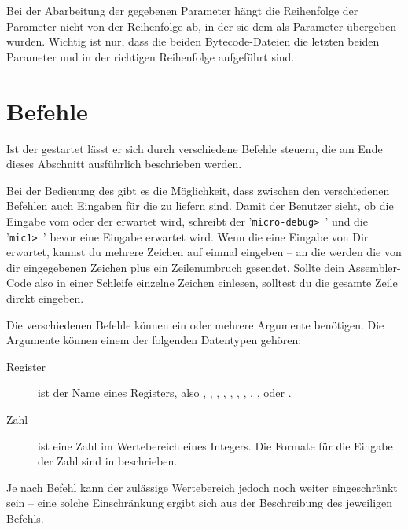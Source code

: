 Bei der Abarbeitung der gegebenen Parameter hängt die Reihenfolge der Parameter nicht von der Reihenfolge ab, in der sie dem \md als Parameter übergeben wurden. Wichtig ist nur, dass die beiden Bytecode-Dateien die letzten beiden Parameter und in der richtigen Reihenfolge aufgeführt sind.

\section{Befehle}
Ist der \md gestartet lässt er sich durch verschiedene Befehle steuern, die am Ende dieses Abschnitt ausführlich beschrieben werden.

Bei der Bedienung des \md gibt es die Möglichkeit, dass zwischen den verschiedenen Befehlen auch Eingaben für die \mic zu liefern sind. Damit der Benutzer sieht, ob die Eingabe vom \md oder der \mic erwartet wird, schreibt der \md '\texttt{micro-debug> }' und die \mic '\texttt{mic1> }' bevor eine Eingabe erwartet wird. Wenn die \mic eine Eingabe von Dir erwartet, kannst du mehrere Zeichen auf einmal eingeben -- an die \mic werden die von dir eingegebenen Zeichen plus ein Zeilenumbruch gesendet. Sollte dein Assembler-Code also in einer Schleife einzelne Zeichen einlesen, solltest du die gesamte Zeile direkt eingeben.

Die verschiedenen Befehle können ein oder mehrere Argumente benötigen. Die Argumente können einem der folgenden Datentypen gehören:
\begin{description}
\item[Register] ist der Name eines Registers, also , , , , , , , , ,  oder .
\item[Zahl] ist eine Zahl im Wertebereich eines Integers. Die Formate für die Eingabe der Zahl sind in  beschrieben.
\end{description}

Je nach Befehl kann der zulässige Wertebereich jedoch noch weiter eingeschränkt sein -- eine solche Einschränkung ergibt sich aus der Beschreibung des jeweiligen Befehls.


